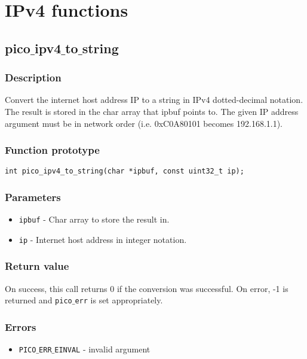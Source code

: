\section{IPv4 functions}


\subsection{pico$\_$ipv4$\_$to$\_$string}

\subsubsection*{Description}
Convert the internet host address IP to a string in IPv4 dotted-decimal notation.
The result is stored in the char array that ipbuf points to. The given IP address argument must be in network order (i.e. 0xC0A80101 becomes 192.168.1.1).

\subsubsection*{Function prototype}
\begin{verbatim}
int pico_ipv4_to_string(char *ipbuf, const uint32_t ip);
\end{verbatim}

\subsubsection*{Parameters}
\begin{itemize}[noitemsep]
\item \texttt{ipbuf} - Char array to store the result in.
\item \texttt{ip} - Internet host address in integer notation.
\end{itemize}

\subsubsection*{Return value}
On success, this call returns 0 if the conversion was successful.
On error, -1 is returned and \texttt{pico$\_$err} is set appropriately.

\subsubsection*{Errors}
\begin{itemize}[noitemsep]
\item \texttt{PICO$\_$ERR$\_$EINVAL} - invalid argument
\end{itemize}

